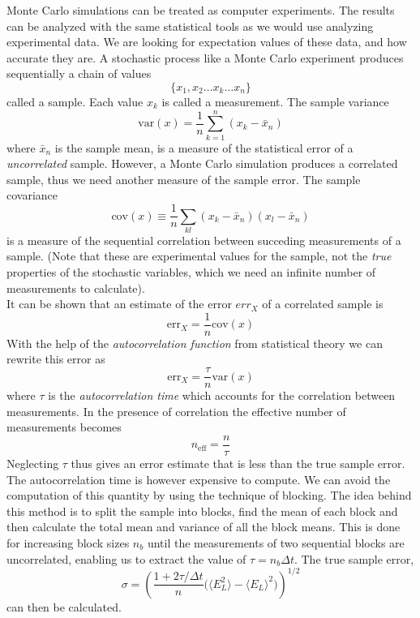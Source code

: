 \documentclass[english, a4paper]{article}
\begin{document}
Monte Carlo simulations can be treated as computer experiments. The results can be analyzed with the same
statistical tools as we would use analyzing experimental data. We are looking for expectation values
of these data, and how accurate they are.
A stochastic process like a Monte Carlo experiment produces sequentially a chain of values
\begin{equation}
 \{x_1, x_2 \dots x_k \dots x_n \}
\end{equation}
called a sample. Each value $x_k$ is called a measurement. The sample variance
\begin{equation}
 \textrm{var}(x) = \frac{1}{n} \sum_{k=1}^n (x_k - \bar{x}_n)
 \label{samplevariance}
\end{equation}
where $\bar{x}_n$ is the sample mean, is a measure of the statistical error of a \textit{uncorrelated} sample.
However, a Monte Carlo simulation produces a correlated sample, thus we need another measure of the sample error.
The sample covariance
\begin{equation}
 \textrm{cov}(x) \equiv \frac{1}{n} \sum_{kl} (x_k - \bar{x}_n) (x_l - \bar{x}_n)
\end{equation}
is a measure of the sequential correlation between succeding measurements of a sample.
(Note that these are experimental values for the sample, not the \textit{true} properties of
the stochastic variables, which we need an infinite number of measurements to calculate).\\

\noindent It can be shown that an estimate of the error $err_X$ 
of a correlated sample is
\begin{equation}
 \textrm{err}_X = \frac{1}{n} \textrm{cov}(x)
\end{equation}
With the help of the \textit{autocorrelation function} from statistical theory we can rewrite
this error as
\begin{equation}
 \textrm{err}_X = \frac{\tau}{n} \textrm{var}(x)
\end{equation}
where $\tau$ is the \textit{autocorrelation time} which accounts
for the correlation between measurements. In the presence of
correlation the effective number of measurements becomes
\begin{equation}
 n_{\textrm{eff}} = \frac{n}{\tau}
\end{equation}
Neglecting $\tau$ thus gives an error estimate that is less than the true sample error. 
The autocorrelation time is however expensive to compute. We can avoid the computation of this quantity by using
the technique of blocking. The idea behind this method is to split the sample into blocks, find the mean of each block
and then calculate the total mean and variance of all the block means.
This is done for increasing block sizes $n_b$ until the measurements of two sequential blocks are uncorrelated,
enabling us to extract the value of $\tau = n_b\Delta t$. The true sample error,
\begin{equation}
 \sigma = \left( \frac{1 + 2\tau / \Delta t}{n} \bigr( \langle E_L^2\rangle - \langle E_L \rangle^2\bigr) \right)^{1/2}
 \label{trueSampleError}
\end{equation}
can then be calculated. \\
\end{document}
